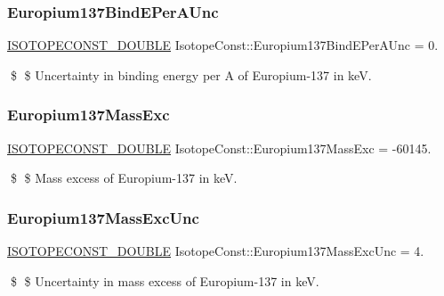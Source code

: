 \subsubsection{\texorpdfstring{Europium137\+Bind\+E\+Per\+A\+Unc}{Europium137BindEPerAUnc}}
{\footnotesize\ttfamily \mbox{\hyperlink{group___isotope_const-_macros_ga8f45a7272ce02c0b4c65c44636ed719a}{I\+S\+O\+T\+O\+P\+E\+C\+O\+N\+S\+T\+\_\+\+D\+O\+U\+B\+LE}} Isotope\+Const\+::\+Europium137\+Bind\+E\+Per\+A\+Unc = 0.}

\$ \$ Uncertainty in binding energy per A of Europium-\/137 in keV. \mbox{\label{group___isotope_const-_europium-_eu137_ga4af0d256ae4bd2c61c770f03ca2e2f70}} 
\subsubsection{\texorpdfstring{Europium137\+Mass\+Exc}{Europium137MassExc}}
{\footnotesize\ttfamily \mbox{\hyperlink{group___isotope_const-_macros_ga8f45a7272ce02c0b4c65c44636ed719a}{I\+S\+O\+T\+O\+P\+E\+C\+O\+N\+S\+T\+\_\+\+D\+O\+U\+B\+LE}} Isotope\+Const\+::\+Europium137\+Mass\+Exc = -\/60145.}

\$ \$ Mass excess of Europium-\/137 in keV. \mbox{\label{group___isotope_const-_europium-_eu137_gaf161e090e45e273acebfafbb9cbd45c9}} 
\subsubsection{\texorpdfstring{Europium137\+Mass\+Exc\+Unc}{Europium137MassExcUnc}}
{\footnotesize\ttfamily \mbox{\hyperlink{group___isotope_const-_macros_ga8f45a7272ce02c0b4c65c44636ed719a}{I\+S\+O\+T\+O\+P\+E\+C\+O\+N\+S\+T\+\_\+\+D\+O\+U\+B\+LE}} Isotope\+Const\+::\+Europium137\+Mass\+Exc\+Unc = 4.}

\$ \$ Uncertainty in mass excess of Europium-\/137 in keV. \mbox{\label{group___isotope_const-_europium-_eu137_ga3bf3a65c2ce066a81f9a42bc2dbd182c}} 
